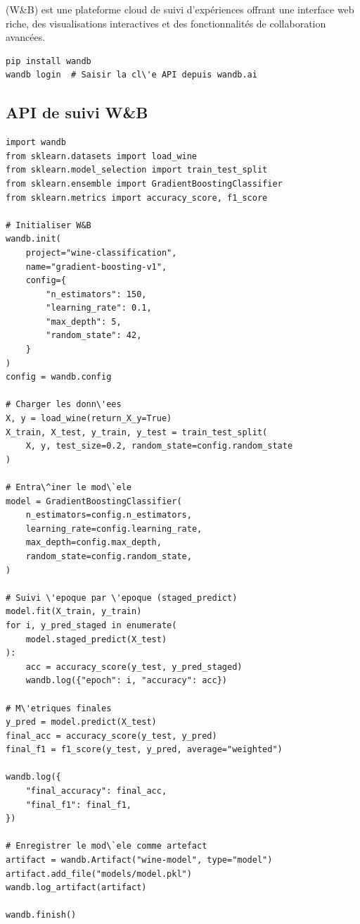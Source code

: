  (W\&B) est une plateforme cloud de suivi
d'exp\'eriences offrant une interface web riche, des visualisations
interactives et des fonctionnalit\'es de collaboration avanc\'ees.

\begin{codeblock}[title=\textbf{Installation et authentification}]
\begin{verbatim}
pip install wandb
wandb login  # Saisir la cl\'e API depuis wandb.ai
\end{verbatim}
\end{codeblock}

\subsection{API de suivi W\&B}

\begin{codeblock}[title=\textbf{Entra\^inement complet avec W\&B}]
\begin{verbatim}
import wandb
from sklearn.datasets import load_wine
from sklearn.model_selection import train_test_split
from sklearn.ensemble import GradientBoostingClassifier
from sklearn.metrics import accuracy_score, f1_score

# Initialiser W&B
wandb.init(
    project="wine-classification",
    name="gradient-boosting-v1",
    config={
        "n_estimators": 150,
        "learning_rate": 0.1,
        "max_depth": 5,
        "random_state": 42,
    }
)
config = wandb.config

# Charger les donn\'ees
X, y = load_wine(return_X_y=True)
X_train, X_test, y_train, y_test = train_test_split(
    X, y, test_size=0.2, random_state=config.random_state
)

# Entra\^iner le mod\`ele
model = GradientBoostingClassifier(
    n_estimators=config.n_estimators,
    learning_rate=config.learning_rate,
    max_depth=config.max_depth,
    random_state=config.random_state,
)

# Suivi \'epoque par \'epoque (staged_predict)
model.fit(X_train, y_train)
for i, y_pred_staged in enumerate(
    model.staged_predict(X_test)
):
    acc = accuracy_score(y_test, y_pred_staged)
    wandb.log({"epoch": i, "accuracy": acc})

# M\'etriques finales
y_pred = model.predict(X_test)
final_acc = accuracy_score(y_test, y_pred)
final_f1 = f1_score(y_test, y_pred, average="weighted")

wandb.log({
    "final_accuracy": final_acc,
    "final_f1": final_f1,
})

# Enregistrer le mod\`ele comme artefact
artifact = wandb.Artifact("wine-model", type="model")
artifact.add_file("models/model.pkl")
wandb.log_artifact(artifact)

wandb.finish()
\end{verbatim}
\end{codeblock}

